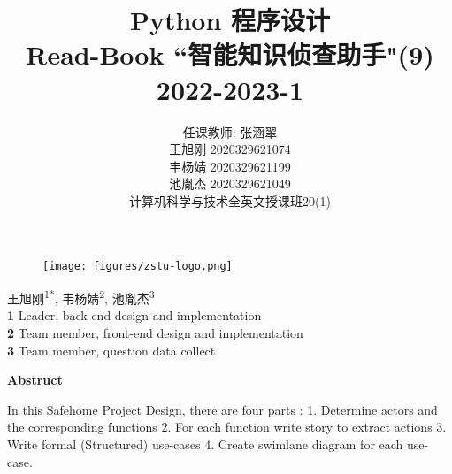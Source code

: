 \documentclass[twoside,11pt]{article}
\newcommand\studentName{\Large \centering 任课教师: 张涵翠\\王旭刚 2020329621074\\韦杨婧 2020329621199\\池胤杰 2020329621049\\计算机科学与技术全英文授课班20(1)\\}
\begin{document}
\begin{figure}[H]
    \centering
    \texttt{[image: figures/zstu-logo.png]}
\end{figure}

\title{\Huge Python 程序设计\\ \vspace{1.5cm} Read-Book ``智能知识侦查助手"(9) \\ \vspace{1.5cm} \huge 2022-2023-1 \\ \vspace{0.8cm}}

\author{\name \studentName{}
    \addr
}

\maketitle
\thispagestyle{empty}
\newpage




\begin{center}
    王旭刚\textsuperscript{1*},
    韦杨婧\textsuperscript{2},
    池胤杰\textsuperscript{3}
    \\
    \bigskip
    \textbf{1} Leader, back-end design and implementation
    \\
    \textbf{2} Team member, front-end design and implementation
    \\
    \textbf{3} Team member, question data collect
    \\
    \bigskip
    \end{center}




\begin{center}
    \Large\textbf{Abstruct}
\end{center}

In this Safehome Project Design, there are four parts : 1. Determine actors and the corresponding functions 2. For each function write story to extract actions 3. Write formal (Structured) use-cases 4. Create swimlane diagram for each use-case.

\newpage



\end{document}

